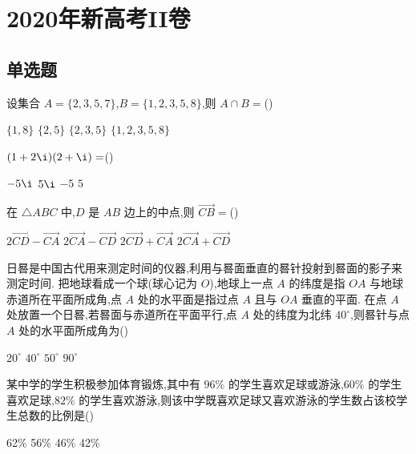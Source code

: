 \chapter{2020年新高考II卷}

\section{单选题}

\begin{problem}
设集合 \(A=\{2,3,5,7\}\),\(B=\{1,2,3,5,8\}\),则 \(A\cap B=\)(\quad)

\choices
    {\(\{1,8\}\)}
    {\(\{2,5\}\)}
    {\(\{2,3,5\}\)}
    {\(\{1,2,3,5,8\}\)}
\end{problem}

\begin{problem}
\((1+2\i)(2+\i)=\)(\quad)

\choices
    {\(-5\i\)}
    {\(5\i\)}
    {\(-5\)}
    {\(5\)}
\end{problem}

\begin{problem}
在 \(\triangle ABC\) 中,\(D\) 是 \(AB\) 边上的中点,则 \(\overrightarrow{CB}=\)(\quad)

\choices
    {\(2\overrightarrow{CD}-\overrightarrow{CA}\)}
    {\(2\overrightarrow{CA}-\overrightarrow{CD}\)}
    {\(2\overrightarrow{CD}+\overrightarrow{CA}\)}
    {\(2\overrightarrow{CA}+\overrightarrow{CD}\)}
\end{problem}

\begin{problem}
日晷是中国古代用来测定时间的仪器,利用与晷面垂直的晷针投射到晷面的影子来测定时间. 把地球看成一个球(球心记为 \(O\)),地球上一点 \(A\) 的纬度是指 \(OA\) 与地球赤道所在平面所成角,点 \(A\) 处的水平面是指过点 \(A\) 且与 \(OA\) 垂直的平面. 在点 \(A\) 处放置一个日晷,若晷面与赤道所在平面平行,点 \(A\) 处的纬度为北纬 \(40^\circ\),则晷针与点 \(A\) 处的水平面所成角为(\quad)

\begin{center}
\end{center}

\choices
    {\(20^\circ\)}
    {\(40^\circ\)}
    {\(50^\circ\)}
    {\(90^\circ\)}
\end{problem}

\begin{problem}
某中学的学生积极参加体育锻炼,其中有 \(96\%\) 的学生喜欢足球或游泳,\(60\%\) 的学生喜欢足球,\(82\%\) 的学生喜欢游泳,则该中学既喜欢足球又喜欢游泳的学生数占该校学生总数的比例是(\quad)

\choices
    {62\%}
    {56\%}
    {46\%}
    {42\%}
\end{problem}

